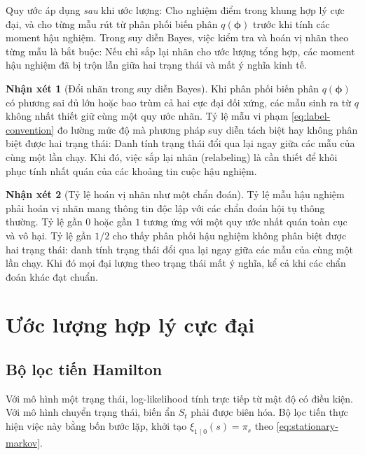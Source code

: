 \documentclass[12pt,a4paper]{article}
\numberwithin{equation}{section}
\theoremstyle{definition}
\newtheorem{remark}{Nhận xét}[section]
\newcommand{\vecphi}{\symbf{\phi}}
\begin{document}
	Quy ước áp dụng \emph{sau} khi ước lượng: Cho nghiệm điểm trong khung hợp lý cực đại, và
	cho từng mẫu rút từ phân phối biến phân $q(\vecphi)$ trước khi tính các moment hậu nghiệm.
	Trong suy diễn Bayes, việc kiểm tra và hoán vị nhãn theo từng mẫu là bắt buộc: Nếu chỉ sắp
	lại nhãn cho ước lượng tổng hợp, các moment hậu nghiệm đã bị trộn lẫn giữa hai trạng thái
	và mất ý nghĩa kinh tế.
	
	\begin{remark}[Đổi nhãn trong suy diễn Bayes]\label{rem:label-switching}
		Khi phân phối biến phân $q(\vecphi)$ có phương sai đủ lớn hoặc bao trùm cả hai cực đại đối
		xứng, các mẫu sinh ra từ $q$ không nhất thiết giữ cùng một quy ước nhãn. Tỷ lệ mẫu vi
		phạm \eqref{eq:label-convention} đo lường mức độ mà phương pháp suy diễn tách biệt hay
		không phân biệt được hai trạng thái: Danh tính trạng thái đổi qua lại ngay giữa các mẫu của
		cùng một lần chạy. Khi đó, việc sắp lại nhãn (relabeling) là cần thiết để khôi phục tính
		nhất quán của các khoảng tin cuộc hậu nghiệm.
	\end{remark}
	
	\begin{remark}[Tỷ lệ hoán vị nhãn như một chẩn đoán]\label{rem:swap-rate}
		Tỷ lệ mẫu hậu nghiệm phải hoán vị nhãn mang thông tin độc lập với các chẩn đoán hội tụ
		thông thường. Tỷ lệ gần $0$ hoặc gần $1$ tương ứng với một quy ước nhất quán toàn cục và
		vô hại. Tỷ lệ gần $1/2$ cho thấy phân phối hậu nghiệm không phân biệt được hai trạng
		thái: danh tính trạng thái đổi qua lại ngay giữa các mẫu của cùng một lần chạy. Khi đó
		mọi đại lượng theo trạng thái mất ý nghĩa, kể cả khi các chẩn đoán khác đạt chuẩn.
	\end{remark}
	
	\section{Ước lượng hợp lý cực đại}\label{sec:mle}
	
	\subsection{Bộ lọc tiến Hamilton}\label{subsec:filter}
	Với mô hình một trạng thái, log-likelihood tính trực tiếp từ mật độ có điều kiện. Với mô
	hình chuyển trạng thái, biến ẩn $S_t$ phải được biên hóa. Bộ lọc tiến \cite{hamilton1989}
	thực hiện việc này bằng bốn bước lặp, khởi tạo $\xi_{1\mid 0}(s)=\pi_s$ theo
	\eqref{eq:stationary-markov}.
	
\end{document}
